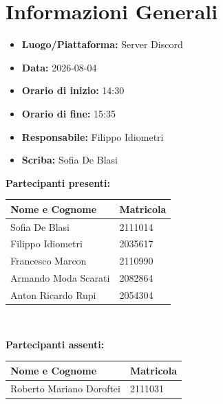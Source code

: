 \section{Informazioni Generali}
\begin{itemize}
	\item \textbf{Luogo/Piattaforma:} Server Discord
	\item \textbf{Data:} 2026-08-04
	\item \textbf{Orario di inizio:} 14:30
	\item \textbf{Orario di fine:} 15:35
	\item \textbf{Responsabile:} Filippo Idiometri
	\item \textbf{Scriba:} Sofia De Blasi
\end{itemize}

\vspace{0.5cm}
\textbf{Partecipanti presenti:}
\begin{table}[ht]
	\centering
	\renewcommand{\arraystretch}{1.2}
	\begin{tabularx}{\textwidth}{X l}
		\toprule
		\textbf{Nome e Cognome} & \textbf{Matricola} \\
		\midrule
		Sofia De Blasi & 2111014 \\
		Filippo Idiometri & 2035617 \\
		Francesco Marcon & 2110990 \\
		Armando Moda Scarati & 2082864 \\
		Anton Ricardo Rupi & 2054304 \\
		\bottomrule
	\end{tabularx}
\\ \end{table}

\vspace{0.5cm}
\textbf{Partecipanti assenti:}
\begin{table}[ht]
	\centering
	\renewcommand{\arraystretch}{1.2}
	\begin{tabularx}{\textwidth}{X l}
		\toprule
		\textbf{Nome e Cognome} & \textbf{Matricola} \\
		\midrule
		Roberto Mariano Doroftei & 2111031 \\
		\bottomrule
	\end{tabularx}
\end{table}

